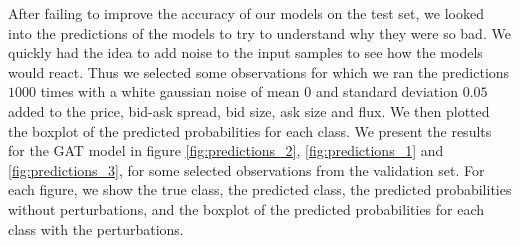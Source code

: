 \documentclass[switch, 11pt]{article}
\begin{document}
\begin{multicols}{2}
    After failing to improve the accuracy of our models on the test set, we looked into the predictions of the models to try to understand why they were so bad. We quickly had the idea to add noise to the input samples to see how the models would react. Thus we selected some observations for which we ran the predictions $1000$ times with a white gaussian noise of mean $0$ and standard deviation $0.05$ added to the price, bid-ask spread, bid size, ask size and flux. We then plotted the boxplot of the predicted probabilities for each class. We present the results for the GAT model in figure \ref{fig:predictions_2}, \ref{fig:predictions_1} and \ref{fig:predictions_3}, for some selected observations from the validation set. For each figure, we show the true class, the predicted class, the predicted probabilities without perturbations, and the boxplot of the predicted probabilities for each class with the perturbations.


\end{multicols}
\end{document}
